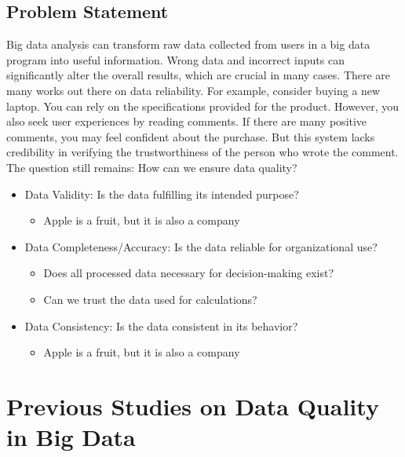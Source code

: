 \documentclass[10pt,a4paper]{article}
\begin{document}
\subsection{Problem Statement}
Big data analysis can transform raw data collected from users in a big data program into useful information. Wrong data and incorrect inputs can significantly alter the overall results, which are crucial in many cases. There are many works out there on data reliability. For example, consider buying a new laptop. You can rely on the specifications provided for the product. However, you also seek user experiences by reading comments. If there are many positive comments, you may feel confident about the purchase. But this system lacks credibility in verifying the trustworthiness of the person who wrote the comment. The question still remains: How can we ensure data quality?
\begin{itemize}
  \item Data Validity: Is the data fulfilling its intended purpose?
  \begin{itemize}
    \item Apple is a fruit, but it is also a company
  \end{itemize}
  \item Data Completeness/Accuracy: Is the data reliable for organizational use?
  \begin{itemize}
      \item Does all processed data necessary for decision-making exist?
      \item Can we trust the data used for calculations?
      \end{itemize}
  \item Data Consistency: Is the data consistent in its behavior?
  \begin{itemize}
    \item Apple is a fruit, but it is also a company
  \end{itemize}
\end{itemize}



\section{Previous Studies on Data Quality in Big Data}
\end{document}
